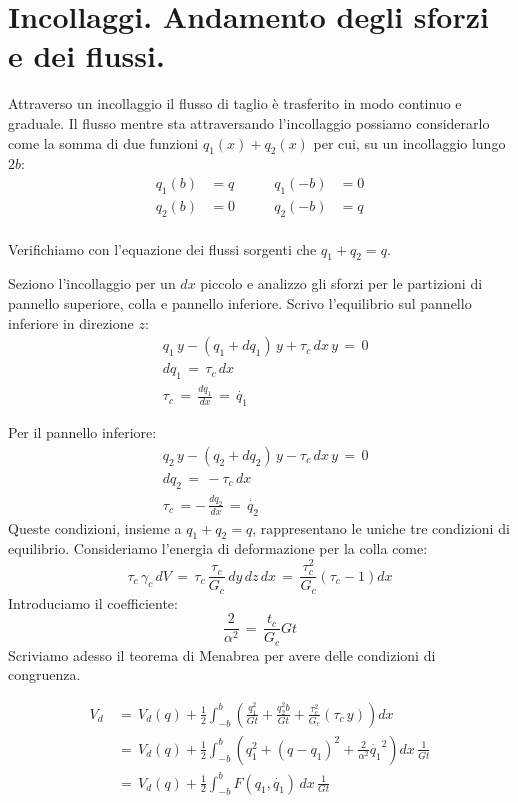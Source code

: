 \section{Incollaggi. Andamento degli sforzi e dei flussi.}


Attraverso un incollaggio il flusso di taglio è trasferito in modo continuo e graduale. Il flusso mentre sta attraversando l'incollaggio possiamo considerarlo come la somma di due funzioni $q_1(x)+q_2(x)$ per cui, su un incollaggio lungo $2b$:
\begin{align*}
    q_1(b) &= q\qquad &q_1(-b)&=0\\
     q_2(b) &= 0\qquad &q_2(-b)&=q\\
\end{align*}

Verifichiamo con l'equazione dei flussi sorgenti che $q_1+q_2=q$.

Seziono l'incollaggio per un $dx$ piccolo e analizzo gli sforzi per le partizioni di pannello superiore, colla e pannello inferiore.
Scrivo l'equilibrio sul pannello inferiore in direzione $z$:
\begin{align*}
   & q_1\,y - (q_1+dq_1)\,y+\tau_c\,dx\,y\,=\,0\\
    &dq_1\,=\,\tau_c\,dx\\
    &\tau_c\,=\, \frac{dq_1}{dx}\,=\,\dot{q_1}
\end{align*}

Per il pannello inferiore:
\begin{align*}
   & q_2\,y - (q_2+dq_2)\,y-\tau_c\,dx\,y\,=\,0\\
    &dq_2\,=\,-\tau_c\,dx\\
    &\tau_c\,=-\, \frac{dq_2}{dx}\,=\,\dot{q_2}
\end{align*}
Queste condizioni, insieme a  $q_1+q_2=q$, rappresentano le uniche tre condizioni di equilibrio.
Consideriamo l'energia di deformazione per la colla come:
\begin{equation*}
    \tau_c\,\gamma_c\,dV\,=\,\tau_c\,\frac{\tau_c}{G_c}\,dy\,dz\,dx\,=\,\frac{\tau_c^2}{G_c} (\tau_c-1)dx
\end{equation*}
Introduciamo il coefficiente:
\begin{equation*}
    \frac{2}{\alpha^2}\,=\,\frac{t_c}{G_c}Gt
\end{equation*}
Scriviamo adesso il teorema di Menabrea per avere delle condizioni di congruenza.


\begin{align*}
    V_{d}\,&=\,V_d(q) +\frac{1}{2} \int_{-b}^b\left( \frac{q_1^2}{Gt}  + \frac{q_2^2b}{Gt} + \frac{\tau_c^2}{G_c}(\tau_c\,y)    \right)dx\\
   &=\,V_d(q) +\frac{1}{2} \int_{-b}^b\left( q_1^2+ (q-q_1)^2+ \frac{2}{\alpha^2} \dot{q_1}^2   \right)dx\, \frac{1}{Gt}\\
     &=\,V_d(q) +\frac{1}{2} \int_{-b}^b  F(q_1, \dot{q_1})\, dx\, \frac{1}{Gt}\\
\end{align*}

